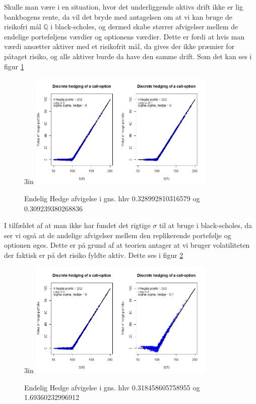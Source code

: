 \documentclass{article}
\theoremstyle{definition}
\theoremstyle{remark}
\begin{document}
Skulle man være i en situation, hvor det underliggende aktivs drift ikke er lig bankbogens rente, da vil det bryde med antagelsen om at vi kan bruge de risikofri mål $\mathbb Q$ i black-scholes, og dermed skabe størrer afvigelser mellem de endelige porteføljens værdier og optionens værdier. Dette er fordi at hvis man værdi ansætter aktiver med et risikofrit mål, da gives der ikke præmier for påtaget risiko, og alle aktiver burde da have den samme drift. Som det kan ses i figur \ref{fig:my_label4}
\begin{figure}{3in}
    \centering
    \includegraphics[width=3.5in]{Rplot24.png}
    \caption{Endelig Hedge afvigelse i gns. hhv 0.328992810316579 og 0.309239380268836}
    \label{fig:my_label4}
\end{figure}

I tilfældet af at man ikke har fundet det rigtige $\sigma$ til at bruge i black-scholes, da ser vi også at de andelige afvigelser mellem den replikerende portefølje og optionen øges. Dette er på grund af at teorien antager at vi bruger volatiliteten der faktisk er på det risiko fyldte aktiv. Dette ses i figur \ref{fig:my_label5}
\begin{figure}{3in}
    \centering
    \includegraphics[width=3.5in]{Rplot25.png}
    \caption{Endelig Hedge afvigelse i gns. hhv 0.318458605758955 og 1.69360232996912}
    \label{fig:my_label5}
\end{figure}
\end{document}
